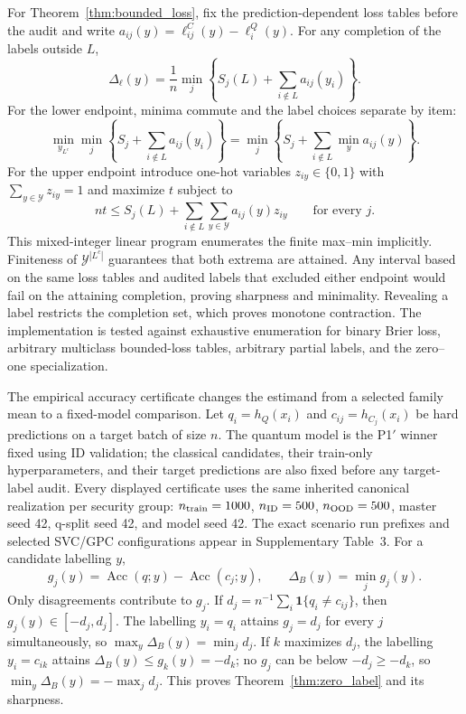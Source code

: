 \documentclass[referee,lineno,pdflatex,sn-vancouver-num]{sn-jnl}
\theoremstyle{thmstyleone}%
\theoremstyle{thmstyletwo}%
\theoremstyle{thmstylethree}%
\begin{document}
For Theorem~\ref{thm:bounded_loss}, fix the prediction-dependent loss tables before the audit and write $a_{ij}(y)=\ell_{ij}^C(y)-\ell_i^Q(y)$. For any completion of the labels outside $L$,
\[
\Delta_\ell(y)=\frac1n\min_j\left\{S_j(L)+
\sum_{i\notin L}a_{ij}(y_i)\right\}.
\]
For the lower endpoint, minima commute and the label choices separate by item:
\[
\min_{y_{L^c}}\min_j\left\{S_j+\sum_{i\notin L}a_{ij}(y_i)\right\}
=\min_j\left\{S_j+\sum_{i\notin L}\min_y a_{ij}(y)\right\}.
\]
For the upper endpoint introduce one-hot variables $z_{iy}\in\{0,1\}$ with $\sum_{y\in\mathcal Y}z_{iy}=1$ and maximize $t$ subject to
\[
nt\leq S_j(L)+\sum_{i\notin L}\sum_{y\in\mathcal Y}
a_{ij}(y)z_{iy}\qquad\text{for every }j.
\]
This mixed-integer linear program enumerates the finite max--min implicitly. Finiteness of $\mathcal Y^{|L^c|}$ guarantees that both extrema are attained. Any interval based on the same loss tables and audited labels that excluded either endpoint would fail on the attaining completion, proving sharpness and minimality. Revealing a label restricts the completion set, which proves monotone contraction. The implementation is tested against exhaustive enumeration for binary Brier loss, arbitrary multiclass bounded-loss tables, arbitrary partial labels, and the zero--one specialization.

The empirical accuracy certificate changes the estimand from a selected family mean to a fixed-model comparison. Let $q_i=h_Q(x_i)$ and $c_{ij}=h_{C_j}(x_i)$ be hard predictions on a target batch of size $n$. The quantum model is the P1$'$ winner fixed using ID validation; the classical candidates, their train-only hyperparameters, and their target predictions are also fixed before any target-label audit. Every displayed certificate uses the same inherited canonical realization per security group: $n_{\rm train}=1000$, $n_{\rm ID}=500$, $n_{\rm OOD}=500$, master seed 42, q-split seed 42, and model seed 42. The exact scenario run prefixes and selected SVC/GPC configurations appear in Supplementary Table~3. For a candidate labelling $y$,
\[
g_j(y)=\operatorname{Acc}(q;y)-\operatorname{Acc}(c_j;y),
\qquad
\Delta_B(y)=\min_j g_j(y).
\]
Only disagreements contribute to $g_j$. If $d_j=n^{-1}\sum_i\mathbf 1\{q_i\neq c_{ij}\}$, then $g_j(y)\in[-d_j,d_j]$. The labelling $y_i=q_i$ attains $g_j=d_j$ for every $j$ simultaneously, so $\max_y\Delta_B(y)=\min_jd_j$. If $k$ maximizes $d_j$, the labelling $y_i=c_{ik}$ attains $\Delta_B(y)\leq g_k(y)=-d_k$; no $g_j$ can be below $-d_j\geq-d_k$, so $\min_y\Delta_B(y)=-\max_jd_j$. This proves Theorem~\ref{thm:zero_label} and its sharpness.
\end{document}

